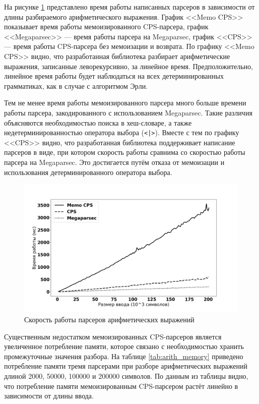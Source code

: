 \documentclass[times]{itmo-student-thesis}
\begin{document}
На рисунке \ref{fig:expr_plot} представлено время работы написанных парсеров в зависимости от длины разбираемого
арифметического выражения. График <<Memo CPS>> показывает время работы мемоизированного CPS-парсера, график
<<Megaparsec>> --- время работы  парсера на Megaparsec,  график <<CPS>> --- время работы CPS-парсера без мемоизации и
возврата. По графику <<Memo CPS>> видно, что разработанная библиотека разбирает арифметические выражения, записанные 
леворекурсивно, за линейное время. Предположительно, линейное время работы будет наблюдаться на всех детерминированных грамматиках,
как в случае с алгоритмом Эрли.

Тем не менее время работы мемоизированного парсера много больше времени работы парсера,
закодированного с использованием Megaparsec. Такие различия объясняются необходимостью поиска в хеш-словаре, а также 
недетерминированностью оператора выбора (\lstinline{<|>}). Вместе с тем по графику <<CPS>> видно, что разработанная библиотека
поддерживает написание парсеров в виде, при котором скорость работы сравнима со скоростью работы парсера на Megaparsec. Это
достигается путём отказа от мемоизации и использования детерминированного оператора выбора.

\begin{figure}[!h]
  \caption{Скорость работы парсеров арифметических выражений}\label{fig:expr_plot}
  \includegraphics[width=0.8\paperwidth]{./images/megaparsec_comparison.png}
\end{figure}

Существенным недостатком мемоизированных CPS-парсеров является увеличенное потребление памяти, которое связано с
необходимостью хранить промежуточные значения разбора. На таблице \ref{tab:arith_memory} приведено потребление памяти
тремя парсерами при разборе арифметических выражений длиной 2000, 50000, 100000 и 200000 символов. По данным из таблицы
видно, что потребление памяти мемоизированным CPS-парсером растёт линейно в зависимости от длины ввода.
\end{document}

